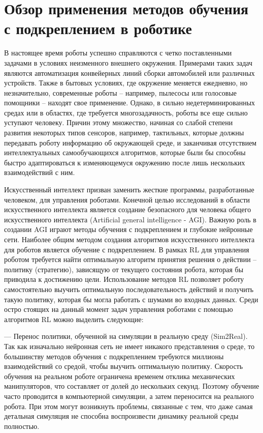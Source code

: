 \section{Обзор применения методов обучения с подкреплением в роботике}\label{sec:ch1/sec2}

В настоящее время роботы успешно справляются с четко поставленными задачами в условиях неизменного внешнего окружения. Примерами таких задач являются автоматизация конвейерных линий сборки автомобилей или различных устройств. Также в бытовых условиях, где окружение меняется ежедневно, но незначительно, современные роботы – например, пылесосы или голосовые помощники – находят свое применение. Однако, в сильно недетерминированных средах или в областях, где требуется многозадачность, роботы все еще сильно уступают человеку. Причин этому множество, начиная со слабой степени развития некоторых типов сенсоров, например, тактильных, которые должны передавать роботу информацию об окружающей среде, и заканчивая отсутствием интеллектуальных самообучающихся алгоритмов, которые были бы способны быстро адаптироваться к изменяющемуся окружению после лишь нескольких взаимодействий с ним. 

Искусственный интеллект призван заменить жесткие программы, разработанные человеком, для управления роботами. Конечной целью исследований в области искусственного интеллекта является создание безопасного для человека общего искусственного интеллекта (Artificial general intelligence - AGI). Важную роль в создании AGI играют методы обучения с подкреплением и глубокие нейронные сети. 
Наиболее общим методом создания алгоритмов искусственного интеллекта для роботов является обучение с подкреплением. В рамках RL для управления роботом требуется найти оптимальную алгоритм принятия решения о действии – политику (стратегию), зависящую от текущего состояния робота, которая бы приводила к достижению цели. Использование методов RL позволяет роботу самостоятельно выучить оптимальную последовательность действий и получить такую политику, которая бы могла работать с шумами во входных данных. Среди остро стоящих на данный момент задач управления роботами с помощью алгоритмов RL можно выделить следующие:

--- Перенос политики, обученной на симуляции в реальную среду (Sim2Real). Так как изначально нейронная сеть не имеет никакого представления о среде, то большинству методов обучения с подкреплением требуются миллионы взаимодействий со средой, чтобы выучить оптимальную политику. Скорость обучения на реальном роботе ограничена временем отклика механических манипуляторов, что составляет от долей до нескольких секунд. Поэтому обучение часто проводится в компьютерной симуляции, а затем переносится на реального робота. При этом могут возникнуть проблемы, связанные с тем, что даже самая детальная симуляция не способна воспроизвести динамику реальной среды полностью. 

